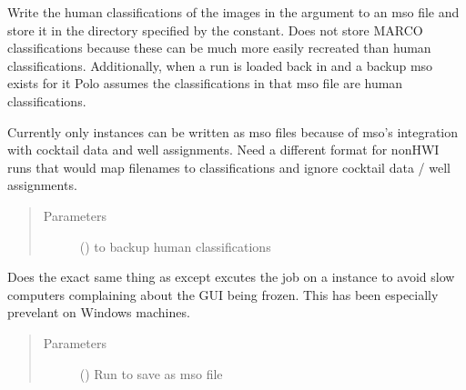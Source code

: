 \documentclass[letterpaper,10pt,english]{sphinxmanual}
\begin{document}
\begin{fulllineitems}
\begin{fulllineitems}
\label{\detokenize{polo.widgets:polo.widgets.run_organizer.RunOrganizer.backup_classifications}}
Write the human classifications of the images in the  argument
to an mso file and store it in the directory specified by the
 constant. Does not store MARCO classifications because
these can be much more easily recreated than human classifications.
Additionally, when a run is loaded back in and a backup mso exists
for it Polo assumes the classifications in that mso file are human
classifications.

Currently only  instances can be written as mso files because of mso’s
integration with cocktail data and well assignments. Need a different
format for non\sphinxhyphen{}HWI runs that would map filenames to classifications
and ignore cocktail data / well assignments.
\begin{quote}\begin{description}
\item[{Parameters}] \leavevmode
{} ({\hyperref[\detokenize{polo.crystallography:polo.crystallography.run.HWIRun}]{}}) \textendash{}  to backup human classifications

\end{description}\end{quote}

\end{fulllineitems}


\begin{fulllineitems}
\label{\detokenize{polo.widgets:polo.widgets.run_organizer.RunOrganizer.backup_classifications_on_thread}}
Does the exact same thing as 
{\hyperref[\detokenize{polo.widgets:polo.widgets.run_organizer.RunOrganizer.backup_classifications}]{}} 
except excutes the job on a  instance to avoid slow
computers complaining about the GUI being frozen. This has been
especially prevelant on Windows machines.
\begin{quote}\begin{description}
\item[{Parameters}] \leavevmode
{} ({\hyperref[\detokenize{polo.crystallography:polo.crystallography.run.HWIRun}]{}}) \textendash{} Run to save as mso file


\end{description}
\end{quote}
\end{fulllineitems}
\end{fulllineitems}
\end{document}
